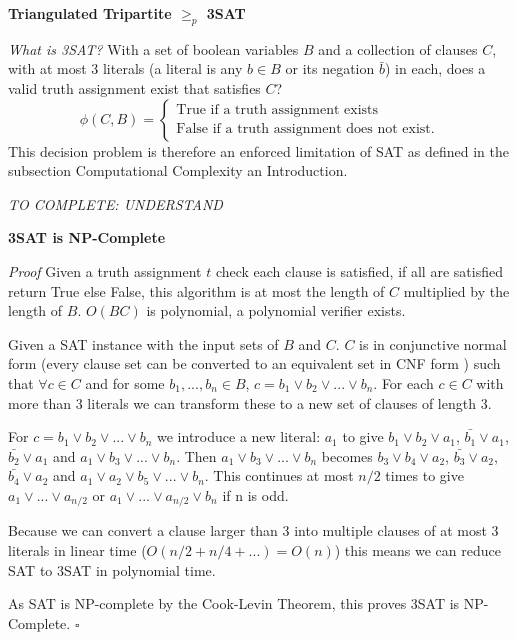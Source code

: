 \documentclass[a4paper,12pt]{article}
\begin{document}
\textbf{Triangulated Tripartite $\geq_p$ 3SAT}

\textit{What is 3SAT?} With a set of boolean variables $B$ and a collection of clauses $C$, with at most 3 literals (a literal is any $b \in B$ or its negation $\bar{b}$) in each, does a valid truth assignment exist that satisfies $C$?
		\begin{equation}
		        \phi (C,B) = \begin{cases}
		            \text{True if a truth assignment exists} \\
		            \text{False if a truth assignment does not exist}.
				\end{cases}
		\end{equation}
This decision problem is therefore an enforced limitation of SAT as defined in the subsection Computational Complexity an Introduction.

 \textit{TO COMPLETE: UNDERSTAND \cite{tripartite to sat}}

\textbf{3SAT is NP-Complete}

\textit{Proof}
Given a truth assignment $t$ check each clause is satisfied, if all are satisfied return True else False, this algorithm is at most the length of $C$ multiplied by the length of $B$. $O(BC)$ is polynomial, a polynomial verifier exists. 

Given a SAT instance with the input sets of $B$ and $C$. $C$ is in conjunctive normal form (every clause set can be converted to an equivalent set in CNF form \cite{CNF}) such that $\forall c \in C$ and for some $b_1, ... ,b_n \in B$, $c = b_1 \lor b_2 \lor ... \lor b_n$. For each $c \in C$ with more than 3 literals we can transform these to a new set of clauses of length 3. 

For $c = b_1 \lor b_2 \lor ... \lor b_n$ we introduce a new literal: $a_1$ to give $b_1 \lor b_2 \lor a_1$, $\bar{b_1} \lor a_1$, $\bar{b_2} \lor a_1$ and $a_1 \lor b_3 \lor ... \lor b_n$. Then $a_1 \lor b_3 \lor ... \lor b_n$ becomes $b_3 \lor b_4 \lor a_2$, $\bar{b_3} \lor a_2$, $\bar{b_4} \lor a_2$ and $a_1 \lor a_2 \lor b_5 \lor ... \lor b_n$. This continues at most $n/2$ times to give $a_1 \lor ... \lor a_{n/2}$ or $a_1 \lor ... \lor a_{n/2} \lor b_n$ if n is odd. 

Because we can convert a clause larger than 3 into multiple clauses of at most 3 literals in linear time ($O(n/2 + n/4 + ...) = O(n)$) this means we can reduce SAT to 3SAT in polynomial time. 

As SAT is NP-complete by the Cook-Levin Theorem, this proves 3SAT is NP-Complete. $\square$
		
\end{document}
